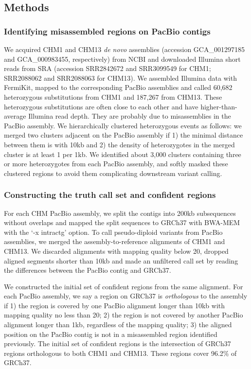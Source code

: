 \documentclass{bioinfo}
\begin{document}
\begin{methods}

\section*{Methods}\label{sec:methods}

\subsubsection*{Identifying misassembled regions on PacBio contigs}

We acquired CHM1 and CHM13 \emph{de novo} assemblies (accession GCA\_001297185
and GCA\_000983455, respectively) from NCBI and downloaded Illumina short reads
from SRA (accession SRR2842672 and SRR3099549 for CHM1; SRR2088062 and
SRR2088063 for CHM13). We assembled Illumina data with FermiKit, mapped
to the corresponding PacBio assemblies and called 60,682 heterozygous
substitutions from CHM1 and 187,267 from CHM13. These heterozygous substitutions
are often close to each other and have higher-than-average Illumina read depth.
They are probably due to misassemblies in the PacBio assembly. We
hierarchically clustered heterozygous events as follows: we merged two clusters
adjacent on the PacBio assembly if 1) the minimal distance between them is with
10kb and 2) the density of heterozygotes in the merged cluster is at least 1
per 1kb. We identified about 3,000 clusters containing three or more
heterozygotes from each PacBio assembly, and softly masked these clustered
regions to avoid them complicating downstream variant calling.

\subsubsection*{Constructing the truth call set and confident regions}

For each CHM PacBio assembly, we split the contigs into 200kb subsequences
without overlaps and mapped the split sequences to GRCh37 with BWA-MEM with the
`-x intractg' option. To call pseudo-diploid variants from PacBio assemblies,
we merged the assembly-to-reference alignments of CHM1 and CHM13. We discarded
alignments with mapping quality below 20, dropped aligned segments shorter than
10kb and made an unfiltered call set by reading the differences between the
PacBio contig and GRCh37.

We constructed the initial set of confident regions from the same alignment.
For each PacBio assembly, we say a region on GRCh37 is \emph{orthologous} to
the assembly if 1) the region is covered by one PacBio alignment longer than
10kb with mapping quality no less than 20; 2) the region is not covered by
another PacBio alignment longer than 1kb, regardless of the mapping quality; 3)
the aligned position on the PacBio contig is not in a misassembled region
identified previously. The initial set of confident regions is the intersection
of GRCh37 regions orthologous to both CHM1 and CHM13. These regions cover
96.2\% of GRCh37.


\end{methods}
\end{document}
